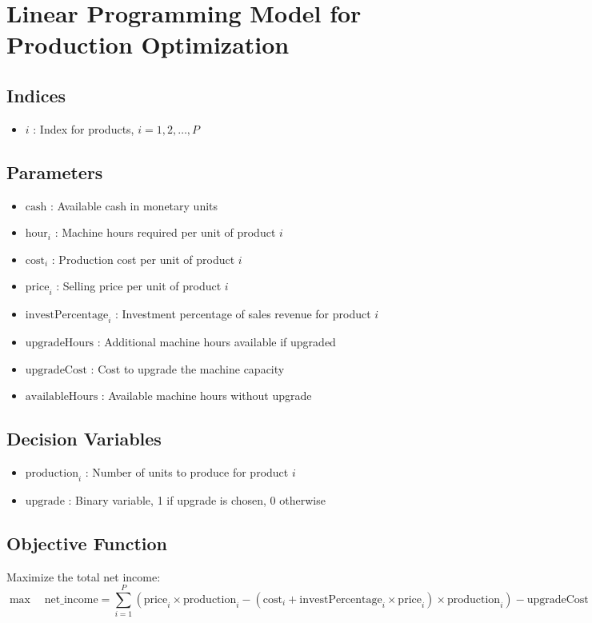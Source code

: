 \documentclass{article}
\begin{document}
\section*{Linear Programming Model for Production Optimization}

\subsection*{Indices}
\begin{itemize}
    \item \( i \) : Index for products, \( i = 1, 2, \ldots, P \)
\end{itemize}

\subsection*{Parameters}
\begin{itemize}
    \item \( \text{cash} \) : Available cash in monetary units
    \item \( \text{hour}_i \) : Machine hours required per unit of product \( i \)
    \item \( \text{cost}_i \) : Production cost per unit of product \( i \)
    \item \( \text{price}_i \) : Selling price per unit of product \( i \)
    \item \( \text{investPercentage}_i \) : Investment percentage of sales revenue for product \( i \)
    \item \( \text{upgradeHours} \) : Additional machine hours available if upgraded
    \item \( \text{upgradeCost} \) : Cost to upgrade the machine capacity
    \item \( \text{availableHours} \) : Available machine hours without upgrade
\end{itemize}

\subsection*{Decision Variables}
\begin{itemize}
    \item \( \text{production}_i \) : Number of units to produce for product \( i \)
    \item \( \text{upgrade} \) : Binary variable, 1 if upgrade is chosen, 0 otherwise
\end{itemize}

\subsection*{Objective Function}
Maximize the total net income:
\[
\max \quad \text{net\_income} = \sum_{i=1}^{P} \left( \text{price}_i \times \text{production}_i - \left( \text{cost}_i + \text{investPercentage}_i \times \text{price}_i \right) \times \text{production}_i \right) - \text{upgradeCost} \times \text{upgrade}
\]
\end{document}

